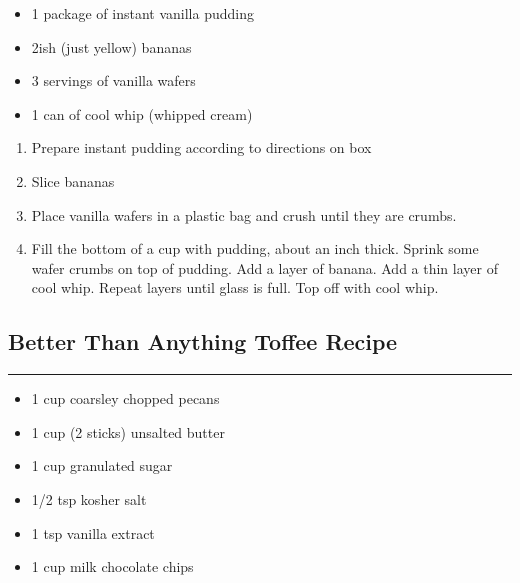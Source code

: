 \documentclass{article}
\begin{document}
\begin{framed}
\begin{itemize}
    \item 1 package of instant vanilla pudding
    \item 2ish (just yellow) bananas
    \item 3 servings of vanilla wafers
    \item 1 can of cool whip (whipped cream)
\end{itemize}
\end{framed}

\begin{enumerate}
    \item 
        Prepare instant pudding according to directions on box
    \item 
        Slice bananas
    \item 
        Place vanilla wafers in a plastic bag and crush until they are crumbs.
    \item 
        Fill the bottom of a cup with pudding, about an inch thick. Sprink some wafer crumbs on top of pudding. Add a layer of banana. Add a thin layer of cool whip. Repeat layers until glass is full. Top off with cool whip.
\end{enumerate}
\newpage

\subsection{Better Than Anything Toffee Recipe} 
\noindent\rule[0.5ex]{\linewidth}{1pt}

\begin{framed}
    \begin{itemize}
        \item 1 cup coarsley chopped pecans
        \item 1 cup (2 sticks) unsalted butter
        \item 1 cup granulated sugar
        \item 1/2 tsp kosher salt
        \item 1 tsp vanilla extract
        \item 1 cup milk chocolate chips
    \end{itemize}
\end{framed}
\end{document}
